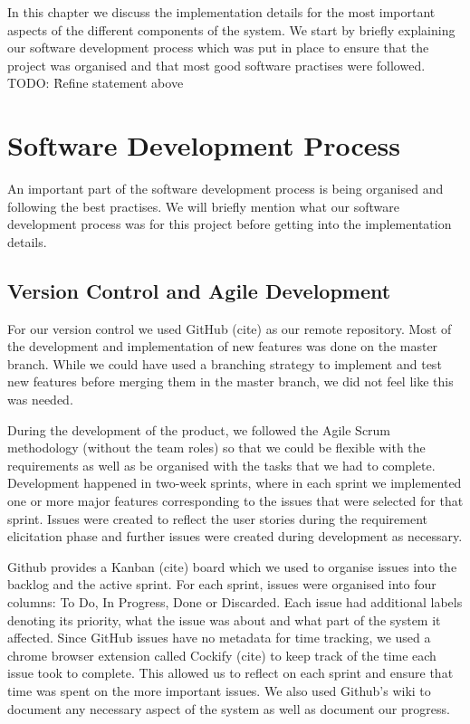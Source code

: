 \documentclass{l4proj}
\begin{document}
In this chapter we discuss the implementation details for the most important aspects of the different components of the system. We start by briefly explaining our software development process which was put in place to ensure that the project was organised and that most good software practises were followed.
TODO: \^ Refine statement above

\section{Software Development Process}

An important part of the software development process is being organised and following the best practises. We will briefly mention what our software development process was for this project before getting into the implementation details.

\subsection{Version Control and Agile Development}
For our version control we used GitHub (cite) as our remote repository. Most of the development and implementation of new features was done on the master branch. While we could have used a branching strategy to implement and test new features before merging them in the master branch, we did not feel like this was needed.

During the development of the product, we followed the Agile Scrum methodology (without the team roles) so that we could be flexible with the requirements as well as be organised with the tasks that we had to complete. Development happened in two-week sprints, where in each sprint we implemented one or more major features corresponding to the issues that were selected for that sprint. Issues were created to reflect the user stories during the requirement elicitation phase and further issues were created during development as necessary. 

Github provides a Kanban (cite) board which we used to organise issues into the backlog and the active sprint. For each sprint, issues were organised into four columns: To Do, In Progress, Done or Discarded. Each issue had additional labels denoting its priority, what the issue was about and what part of the system it affected. Since GitHub issues have no metadata for time tracking, we used a chrome browser extension called Cockify (cite) to keep track of the time each issue took to complete. This allowed us to reflect on each sprint and ensure that time was spent on the more important issues. We also used Github's wiki to document any necessary aspect of the system as well as document our progress.
\end{document}
